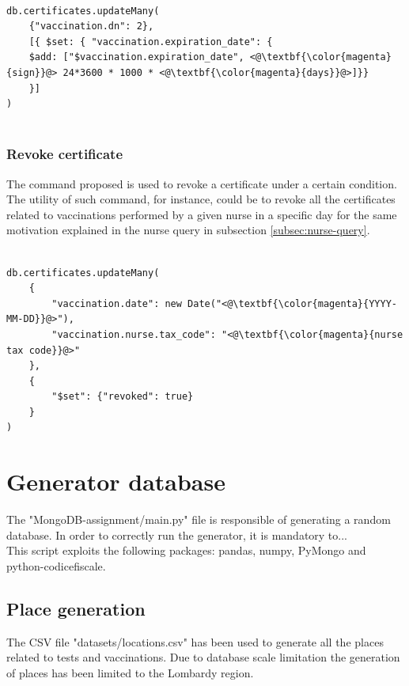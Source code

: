 \documentclass{article}
\begin{document}
\begin{lstlisting}[language=cypher, label=lst:cypher-example]

db.certificates.updateMany(
    {"vaccination.dn": 2},
    [{ $set: { "vaccination.expiration_date": {
    $add: ["$vaccination.expiration_date", <@\textbf{\color{magenta}{sign}}@> 24*3600 * 1000 * <@\textbf{\color{magenta}{days}}@>]}}
    }]
)


\end{lstlisting}
\subsubsection{Revoke certificate}
The command proposed is used to revoke a certificate under a certain condition.
The utility of such command, for instance, could be to revoke all the certificates related to vaccinations performed by a given nurse in a specific day for the same motivation
explained in the nurse query in subsection \ref{subsec:nurse-query}.

\begin{lstlisting}[language=cypher, label=lst:cypher-example]

db.certificates.updateMany(
    {
        "vaccination.date": new Date("<@\textbf{\color{magenta}{YYYY-MM-DD}}@>"),
        "vaccination.nurse.tax_code": "<@\textbf{\color{magenta}{nurse tax code}}@>"
    },
    {
        "$set": {"revoked": true}
    }
)

\end{lstlisting}
\newpage
\section{Generator database}
The {\selectfont"MongoDB-assignment/main.py"} file is responsible of generating a random database.
In order to correctly run the generator, it is mandatory to...
\\This script exploits the following packages: {\selectfont pandas, numpy, PyMongo and python-codicefiscale}.

\subsection{Place generation}
The CSV file {\selectfont"datasets/locations.csv"} has been used to generate all the places related to tests and vaccinations. Due to database scale limitation the generation of places has been limited to the Lombardy region.
\end{document}
